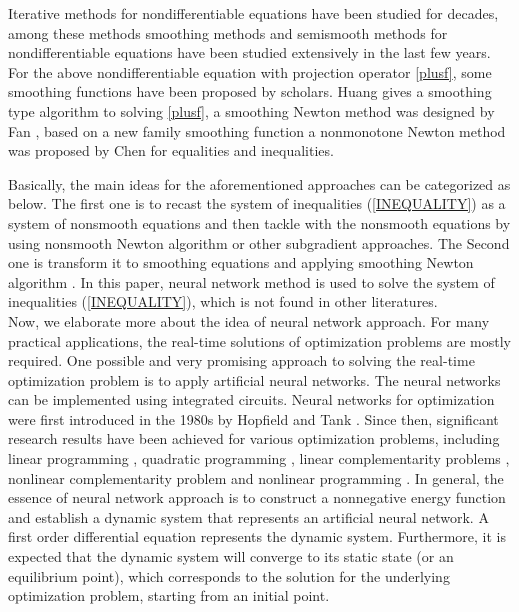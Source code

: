 \documentclass[12pt]{article}
\begin{document}
 Iterative methods for nondifferentiable equations have been studied for decades, among these methods
 smoothing methods and semismooth methods for nondifferentiable equations  have been studied extensively in the last few
years. For the above nondifferentiable equation with  projection operator \eqref{plusf}, some smoothing functions have been proposed by scholars.  Huang \cite{HZ2008} gives a smoothing type algorithm to solving  \eqref{plusf}, a smoothing Newton method was designed by Fan \cite{fy18}, based on a new family smoothing function a nonmonotone Newton method was proposed by Chen \cite{Chen2016} for equalities and inequalities.

 Basically, the main ideas for the aforementioned approaches can be categorized
 as below.  The first one  is  to recast the system of inequalities (\ref{INEQUALITY}) as a system of nonsmooth equations
 and then tackle with the nonsmooth equations by using nonsmooth Newton  algorithm \cite{Qi93} or
 other subgradient approaches. The Second
 one is transform it to smoothing equations and applying smoothing Newton algorithm \cite{QSZ00}.
 In this paper,  neural network method is used to solve the system of inequalities (\ref{INEQUALITY}),
  which is not found in other literatures.
 \\

 Now, we elaborate more about the idea of neural network approach. For many
 practical applications, the real-time solutions of optimization problems are
 mostly required. One possible and very promising approach to solving the real-time
 optimization problem is to apply artificial neural networks. The neural networks
 can be implemented using integrated circuits. Neural networks for optimization
 were first introduced in the 1980s by Hopfield and Tank \cite{HT85, TH86}. Since
 then, significant research results have been achieved for various optimization
 problems, including linear programming \cite{ZUH95}, quadratic programming
 \cite{BP93}, linear complementarity problems \cite{LQ99}, nonlinear complementarity
 problem \cite{LQQ01} and nonlinear programming \cite{CU93}. In general, the
 essence of neural network approach is to construct a nonnegative energy function
 and establish a dynamic system that represents an artificial neural network.
 A first order differential equation represents the dynamic system. Furthermore,
 it is expected that the dynamic system will converge to its static state (or an
 equilibrium point), which corresponds to the solution for the underlying
 optimization problem, starting from an initial point.
 \\
\end{document}
